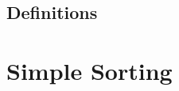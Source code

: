 \documentclass[a4paper]{scrreprt}
\begin{document}

\section{Definitions}

\chapter{Simple Sorting}

\end{document}
